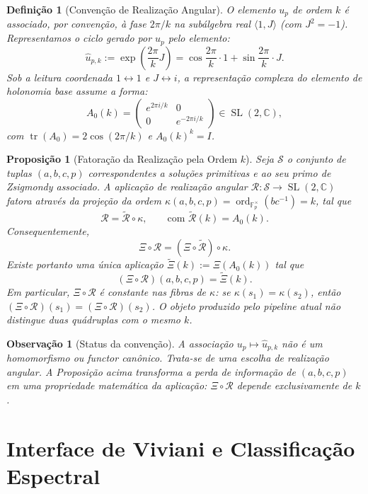 \documentclass[11pt,a4paper]{article}
\newtheorem{proposicao}[teorema]{Proposição}
\newtheorem{definicao}[teorema]{Definição}
\newtheorem{observacao}[teorema]{Observação}
\begin{document}
\begin{definicao}[Convenção de Realização Angular]
O elemento $u_p$ de ordem $k$ é associado, por convenção, à fase $2\pi/k$ na subálgebra real $\langle 1, J \rangle$ (com $J^2 = -1$). Representamos o ciclo gerado por $u_p$ pelo elemento:
\[
\widehat{u}_{p,k} := \exp\left(\frac{2\pi}{k}J\right) = \cos\frac{2\pi}{k}\cdot 1 + \sin\frac{2\pi}{k}\cdot J.
\]
Sob a leitura coordenada $1 \longleftrightarrow 1$ e $J \longleftrightarrow i$, a representação complexa do elemento de holonomia base assume a forma:
\[
A_0(k) = \begin{pmatrix} e^{2\pi i/k} & 0 \\ 0 & e^{-2\pi i/k} \end{pmatrix} \in \operatorname{SL}(2, \mathbb{C}),
\]
com $\operatorname{tr}(A_0) = 2\cos(2\pi/k)$ e $A_0(k)^k = I$.
\end{definicao}

\begin{proposicao}[Fatoração da Realização pela Ordem $k$]
Seja $\mathcal{S}$ o conjunto de tuplas $(a,b,c,p)$ correspondentes a soluções primitivas e ao seu primo de Zsigmondy associado. A aplicação de realização angular $\mathcal{R}:\mathcal{S}\to\operatorname{SL}(2,\mathbb{C})$ fatora através da projeção da ordem $\kappa(a,b,c,p)=\operatorname{ord}_{\mathbb{F}_p^\times}(bc^{-1})=k$, tal que
\[
\mathcal{R}=\widetilde{\mathcal{R}}\circ\kappa,\qquad\text{com }\widetilde{\mathcal{R}}(k)=A_0(k).
\]
Consequentemente,
\[
\Xi\circ\mathcal{R}=(\Xi\circ\widetilde{\mathcal{R}})\circ\kappa.
\]
Existe portanto uma única aplicação $\widetilde{\Xi}(k):=\Xi(A_0(k))$ tal que
\[
(\Xi\circ\mathcal{R})(a,b,c,p)=\widetilde{\Xi}(k).
\]
Em particular, $\Xi\circ\mathcal{R}$ é constante nas fibras de $\kappa$: se $\kappa(s_1)=\kappa(s_2)$, então $(\Xi\circ\mathcal{R})(s_1)=(\Xi\circ\mathcal{R})(s_2)$. O objeto produzido pelo pipeline atual não distingue duas quádruplas com o mesmo $k$.
\end{proposicao}

\begin{observacao}[Status da convenção]
A associação $u_p\mapsto\widehat{u}_{p,k}$ não é um homomorfismo ou functor canônico. Trata-se de uma escolha de realização angular. A Proposição acima transforma a perda de informação de $(a,b,c,p)$ em uma propriedade matemática da aplicação: $\Xi\circ\mathcal{R}$ depende exclusivamente de $k$.
\end{observacao}

\section{Interface de Viviani e Classificação Espectral}
\end{document}
